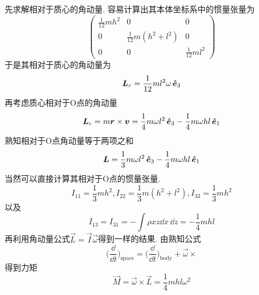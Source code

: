 \begin{solution}
    先求解相对于质心的角动量. 
    容易计算出其本体坐标系中的惯量张量为
    $$\begin{pmatrix}
        \frac{1}{12}mh^2&0&0\\0&\frac{1}{12}m(h^2+l^2)&0\\0&0&\frac{1}{12}ml^2
    \end{pmatrix}$$
    于是其相对于质心的角动量为
    $$\boldsymbol{L}_r=\frac{1}{12}ml^2\omega \,\boldsymbol{\hat{e}}_3$$
    再考虑质心相对于O点的角动量
    $$\boldsymbol{L}_c=m\boldsymbol{r}\times\boldsymbol{v}=\frac14m\omega l^2\,\boldsymbol{\hat{e}}_3-\frac14m\omega hl\,\boldsymbol{\hat{e}}_1$$
    熟知相对于O点角动量等于两项之和
    $$\boldsymbol{L}=\frac13m\omega l^2\,\boldsymbol{\hat{e}}_3-\frac14m\omega hl\,\boldsymbol{\hat{e}}_1$$
    当然可以直接计算其相对于O点的惯量张量. 
    $$I_{11}=\frac13mh^2,I_{22}=\frac13m(h^2+l^2),I_33=\frac13mh^2$$
    以及
    $$I_{13}=I_{31}=-\int\rho xz\dd x\,\dd z=-\frac14mhl$$
    再利用角动量公式$\vec{L}=\vec{I}\vec{\omega}$得到一样的结果. 
    由熟知公式
    $$\Big(\frac{\dd}{\dd t}\Big)_{\text{space}}=\Big(\frac{\dd}{\dd t}\Big)_{\text{body}}+\vec{\omega}\times$$
    得到力矩
    $$\vec{M}=\vec{\omega}\times\vec{L}=\frac14mhl\omega^2$$
\end{solution}
